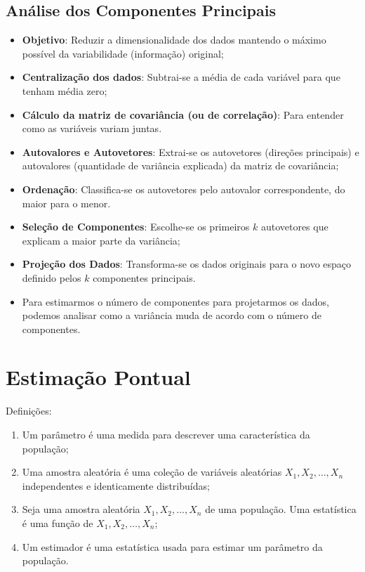 \documentclass{article}
\begin{document}
\subsection{Análise dos Componentes Principais}
\begin{itemize}
    \item \textbf{Objetivo}: Reduzir a dimensionalidade dos dados mantendo o máximo possível da variabilidade (informação) original;
    \item \textbf{Centralização dos dados}: Subtrai-se a média de cada variável para que tenham média zero;
    \item \textbf{Cálculo da matriz de covariância (ou de correlação)}: Para entender como as variáveis variam juntas.
    \item \textbf{Autovalores e Autovetores}: Extrai-se os autovetores (direções principais) e autovalores (quantidade de variância explicada) da matriz de covariância;
    \item \textbf{Ordenação}: Classifica-se os autovetores pelo autovalor correspondente, do maior para o menor.
    \item \textbf{Seleção de Componentes}: Escolhe-se os primeiros $k$ autovetores que explicam a maior parte da variância;
    \item \textbf{Projeção dos Dados}: Transforma-se os dados originais para o novo espaço definido pelos $k$ componentes principais.
    \item Para estimarmos o número de componentes para projetarmos os dados, podemos analisar como a variância muda de acordo com o número de componentes.
\end{itemize}

\section{Estimação Pontual}
Definições:
\begin{enumerate}
    \item Um parâmetro é uma medida para descrever uma característica da população;
    \item Uma amostra aleatória é uma coleção de variáveis aleatórias 
    $X_1, X_2, \ldots, X_n$ independentes e identicamente distribuídas;
    \item Seja uma amostra aleatória $X_1, X_2, \ldots, X_n$ de uma população. Uma estatística é uma função de $X_1, X_2, \ldots, X_n$;
    \item Um estimador é uma estatística usada para estimar um parâmetro da população.
\end{enumerate}
\end{document}
